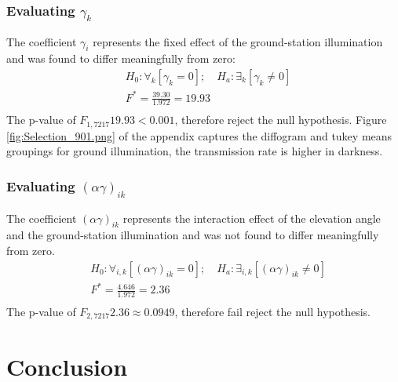 \documentclass[oneside,a4paper,12pt]{book}
\begin{document}
\subsubsection*{Evaluating $\gamma_k $}

The coefficient $\gamma_i $ represents the fixed effect of the ground-station illumination and was found to differ meaningfully from zero:
$$
\begin{aligned}
&H_0: \forall_k  [\gamma_k = 0]; \quad H_a:  \exists_k [ \gamma_k \neq 0]\\
&F^* = \frac{39.30}{1.972} = 19.93\\
\end{aligned}
$$
The p-value of  $F_{1,7217} 19.93 < 0.001$, therefore reject the null hypothesis.  Figure \ref{fig:Selection_901.png} of the appendix captures the diffogram and tukey means groupings for ground illumination, the transmission rate is higher in darkness.

\subsubsection*{Evaluating $(\alpha\gamma)_{ik} $}

The coefficient $(\alpha\gamma)_{ik} $ represents the interaction effect of the elevation angle and the ground-station illumination and was not found to differ meaningfully from zero.
$$
\begin{aligned}
&H_0: \forall_{i,k}  [(\alpha\gamma)_{ik} = 0]; \quad H_a:  \exists_{i,k}  [(\alpha\gamma)_{ik} \neq 0]\\
&F^* = \frac{4.646}{1.972} = 2.36\\
\end{aligned}
$$
The p-value of  $F_{2,7217} 2.36 \approx 0.0949$, therefore fail reject the null hypothesis.


\section*{Conclusion }
\end{document}
